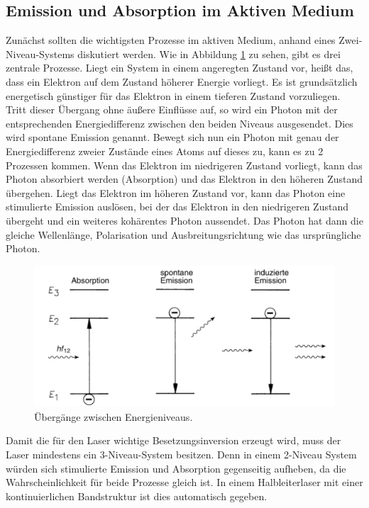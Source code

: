 \subsection{Emission und Absorption im Aktiven Medium}
Zunächst sollten die wichtigsten Prozesse im aktiven Medium, anhand eines Zwei-Niveau-Systems diskutiert werden. 
Wie in Abbildung \ref{fig:Prozesse} zu sehen, gibt es drei zentrale Prozesse. Liegt ein System in einem angeregten Zustand vor, heißt das, dass ein Elektron auf dem Zustand höherer Energie vorliegt.
Es ist grundsätzlich energetisch günstiger für das Elektron in einem tieferen Zustand vorzuliegen. Tritt dieser Übergang ohne äußere Einflüsse auf, so wird ein Photon mit der entsprechenden Energiedifferenz zwischen den beiden Niveaus ausgesendet. Dies wird spontane Emission genannt.
Bewegt sich nun ein Photon mit genau der Energiedifferenz zweier Zustände eines Atoms auf dieses zu, kann es zu 2 Prozessen kommen.
Wenn das Elektron im niedrigeren Zustand vorliegt, kann das Photon absorbiert werden (Absorption) und 
das Elektron in den höheren Zustand übergehen. Liegt das Elektron im höheren Zustand vor, kann das Photon eine stimulierte Emission auslösen, bei der 
das Elektron in den niedrigeren Zustand übergeht und ein weiteres kohärentes Photon aussendet. Das Photon hat dann die gleiche Wellenlänge, Polarisation und Ausbreitungsrichtung wie das ursprüngliche Photon.
\begin{figure}[H]
    \centering
    \includegraphics[scale=0.9]{pictures/Prozesse.png}
    \caption{Übergänge zwischen Energieniveaus\cite{Eichler20152}.}
    \label{fig:Prozesse}
\end{figure}
\noindent Damit die für den Laser wichtige Besetzungsinversion erzeugt wird, muss der Laser mindestens ein 3-Niveau-System besitzen.
Denn in einem 2-Niveau System würden sich stimulierte Emission und Absorption gegenseitig aufheben, da die Wahrscheinlichkeit für beide Prozesse gleich ist.
In einem Halbleiterlaser mit einer kontinuierlichen Bandstruktur ist dies automatisch gegeben.
